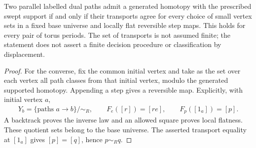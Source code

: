 \begin{lemma}
    \label{lem:peps_dual_flat_transport_completeness}
    \leanok
    Two parallel labelled dual paths admit a generated homotopy with
    the prescribed swept support if and only if their transports agree
    for every choice of small vertex sets in a fixed base universe and
    locally flat reversible step maps. This holds for every pair of torus
    periods. The set of transports is not assumed finite; the statement
    does not assert a finite decision procedure or classification by displacement.
\end{lemma}
\begin{proof}\leanok
    For the converse, fix the common initial vertex and take as the set
    over each vertex all path classes from that initial vertex, modulo
    the generated supported homotopy. Appending a step gives a reversible
    map. Explicitly, with initial vertex $a$,
    \begin{align}
        Y_b=\{\text{paths }a\to b\}/{\sim_R},\qquad
        F_e([r])=[re],\qquad F_p([1_a])=[p].
        \label{eq:peps_flat_transport_path_classes}
    \end{align}
    A backtrack proves the inverse law and an allowed square proves local
    flatness. These quotient sets belong to the base universe. The asserted
    transport equality at $[1_a]$ gives $[p]=[q]$, hence $p\sim_Rq$.
\end{proof}

